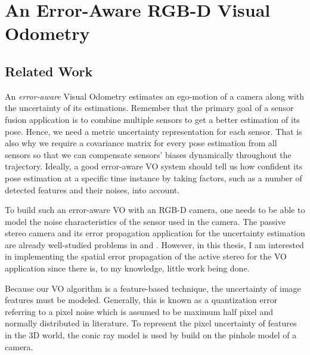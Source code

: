 \documentclass[a4paper]{report}
\numberwithin{figure}{section}
\begin{document}
\chapter{An Error-Aware RGB-D Visual Odometry} \label{cp_covo}

\section{Related Work} \label{sc_error_aware_visual_odometry_related_works}

An \textit{error-aware} Visual Odometry estimates an ego-motion of a camera
along with the uncertainty of its estimations.  Remember that the primary goal
of a sensor fusion application is to combine multiple sensors to get a better
estimation of its pose.  Hence, we need a metric uncertainty
representation for each sensor.  That is also why we require a covariance 
matrix for
every pose estimation from all sensors so that we can compensate sensors'
biases dynamically throughout the trajectory.  Ideally, a good error-aware VO
system should tell us how confident its pose estimation at a specific time
instance by taking factors, such as a number of detected features and their
noises, into account.

To build such an error-aware VO with an RGB-D camera, one needs to be able to
model the noise characteristics of the sensor used in the camera. The passive
stereo camera and its error propagation application for the uncertainty
estimation are already well-studied problems in \parencite{Leo2011} and
\parencite{Miura1993AnUM}.
However, in this thesis, I am interested in implementing the spatial error
propagation of the active stereo for the VO application since there is, to my
knowledge, little work being done.

Because our VO algorithm is a feature-based technique, the uncertainty of image
features must be modeled.  Generally, this is known as a quantization error
referring to a pixel noise \parencite{RichardHartley2003} which is assumed to 
be
maximum half pixel and normally distributed in literature.  To represent the
pixel uncertainty of features in the 3D world, the conic ray model
\parencite{Sola2007a} is used by build on the pinhole model of a camera.
\end{document}
